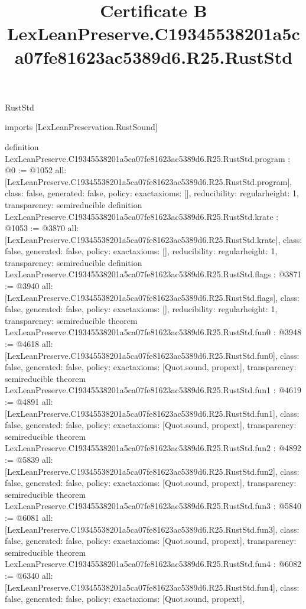 \begin{lexlean}{RustStd}
\title{Certificate B LexLeanPreserve.C19345538201a5ca07fe81623ac5389d6.R25.RustStd}
\begin{coremodule}
imports [LexLeanPreservation.RustSound]

definition LexLeanPreserve.C19345538201a5ca07fe81623ac5389d6.R25.RustStd.program : @0 := @1052 {
  all: [LexLeanPreserve.C19345538201a5ca07fe81623ac5389d6.R25.RustStd.program],
  class: false,
  generated: false,
  policy: exact{axioms: []},
  reducibility: regular{height: 1},
  transparency: semireducible
}
definition LexLeanPreserve.C19345538201a5ca07fe81623ac5389d6.R25.RustStd.krate : @1053 := @3870 {
  all: [LexLeanPreserve.C19345538201a5ca07fe81623ac5389d6.R25.RustStd.krate],
  class: false,
  generated: false,
  policy: exact{axioms: []},
  reducibility: regular{height: 1},
  transparency: semireducible
}
definition LexLeanPreserve.C19345538201a5ca07fe81623ac5389d6.R25.RustStd.flags : @3871 := @3940 {
  all: [LexLeanPreserve.C19345538201a5ca07fe81623ac5389d6.R25.RustStd.flags],
  class: false,
  generated: false,
  policy: exact{axioms: []},
  reducibility: regular{height: 1},
  transparency: semireducible
}
theorem LexLeanPreserve.C19345538201a5ca07fe81623ac5389d6.R25.RustStd.fun0 : @3948 := @4618 {
  all: [LexLeanPreserve.C19345538201a5ca07fe81623ac5389d6.R25.RustStd.fun0],
  class: false,
  generated: false,
  policy: exact{axioms: [Quot.sound, propext]},
  transparency: semireducible
}
theorem LexLeanPreserve.C19345538201a5ca07fe81623ac5389d6.R25.RustStd.fun1 : @4619 := @4891 {
  all: [LexLeanPreserve.C19345538201a5ca07fe81623ac5389d6.R25.RustStd.fun1],
  class: false,
  generated: false,
  policy: exact{axioms: [Quot.sound, propext]},
  transparency: semireducible
}
theorem LexLeanPreserve.C19345538201a5ca07fe81623ac5389d6.R25.RustStd.fun2 : @4892 := @5839 {
  all: [LexLeanPreserve.C19345538201a5ca07fe81623ac5389d6.R25.RustStd.fun2],
  class: false,
  generated: false,
  policy: exact{axioms: [Quot.sound, propext]},
  transparency: semireducible
}
theorem LexLeanPreserve.C19345538201a5ca07fe81623ac5389d6.R25.RustStd.fun3 : @5840 := @6081 {
  all: [LexLeanPreserve.C19345538201a5ca07fe81623ac5389d6.R25.RustStd.fun3],
  class: false,
  generated: false,
  policy: exact{axioms: [Quot.sound, propext]},
  transparency: semireducible
}
theorem LexLeanPreserve.C19345538201a5ca07fe81623ac5389d6.R25.RustStd.fun4 : @6082 := @6340 {
  all: [LexLeanPreserve.C19345538201a5ca07fe81623ac5389d6.R25.RustStd.fun4],
  class: false,
  generated: false,
  policy: exact{axioms: [Quot.sound, propext]},
}
\end{coremodule}
\end{lexlean}
